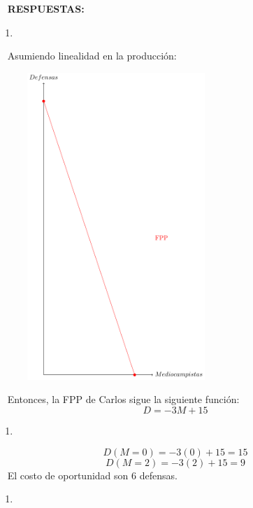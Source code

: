 \documentclass[
  letterpaper,
  DIV=11,
  numbers=noendperiod]{scrreport}
\providecommand{\tightlist}{%
  \setlength{\itemsep}{0pt}\setlength{\parskip}{0pt}}\usepackage{longtable,booktabs,array}
\begin{document}
~ \textbf{RESPUESTAS:}

\begin{enumerate}
\def\labelenumi{\alph{enumi})}
\tightlist
\item
\end{enumerate}

~ Asumiendo linealidad en la producción:

\begin{figure}

{\centering \includegraphics[width=0.6\textwidth,height=\textheight]{7,8titulo_files/figure-pdf/unnamed-chunk-9-1.pdf}

}

\end{figure}

~ Entonces, la FPP de Carlos sigue la siguiente función: \[D=-3M+15\]

\begin{enumerate}
\def\labelenumi{\alph{enumi})}
\setcounter{enumi}{1}
\tightlist
\item
\end{enumerate}

\[D(M=0)=-3(0)+15= 15 \] \[D(M=2)=-3(2)+15=9 \] ~ El costo de
oportunidad son 6 defensas.

\begin{enumerate}
\def\labelenumi{\alph{enumi})}
\setcounter{enumi}{2}
\tightlist
\item
\end{enumerate}
\end{document}
